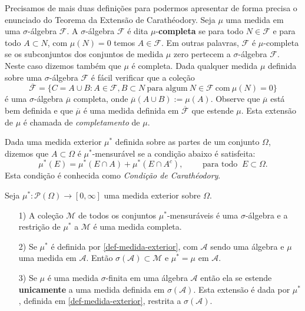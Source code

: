 Precisamos de mais duas definições para podermos 
apresentar de forma precisa o enunciado
do Teorema da Extensão de Carathéodory.
Seja $\mu$ uma medida em uma $\sigma$-álgebra $\mathcal{F}$.
A $\sigma$-álgebra $\mathcal{F}$ é dita $\mu$-{\bf completa} 
se para todo $N\in \mathcal{F}$ e para todo $A\subset N$, 
com $\mu(N)=0$ temos $A\in \mathcal{F}$.
Em outras palavras, $\mathcal{F}$ é $\mu$-completa 
se os subconjuntos dos conjuntos de medida $\mu$ zero
pertecem a $\sigma$-álgebra $\mathcal{F}$.
Neste caso dizemos também que $\mu$ é completa.
Dada qualquer medida $\mu$ definida sobre uma 
$\sigma$-álgebra $\mathcal{F}$ é fácil verificar que 
a coleção 
$$
\overline{\mathcal{F}}
=
\{ 	
	C=A\cup B: A\in\mathcal{F}, B\subset N\ \text{para algum}\ N\in\mathcal{F}\ \text{com}\ \mu(N)=0	
\}
$$
é uma $\sigma$-álgebra $\overline{\mu}$ completa, onde $\overline{\mu}(A\cup B):=\mu(A)$.
Observe que $\overline{\mu}$ está bem definida e 
que $\overline{\mu}$ é uma medida definida em $\overline{\mathcal{F}}$ que estende $\mu$.
Esta extensão de $\mu$ é chamada de  
{\it completamento}
de $\mu$.





\begin{definicao}
Dada uma medida exterior $\mu^{*}$ definida sobre as partes de um conjunto $\Omega$,
dizemos que $A\subset \Omega$ é $\mu^{*}$-mensurável se a condição abaixo é satisfeita:
\begin{equation}\label{cond-caratheodory}
\mu^{*}(E) = \mu^*(E\cap A) + \mu^*(E\cap A^c),
\qquad
\text{ para todo } \ E\subset\Omega.
\end{equation}
Esta condição é conhecida como {\it Condição de Carathéodory}.
\end{definicao}




\begin{teorema}
\label{teorema-caratheodory}
Seja $\mu^*:\mathcal{P}(\Omega)\to [0,\infty]$ uma medida exterior sobre $\Omega$.
\begin{itemize}
	\item[1)] A coleção $\mathcal{M}$ de todos os conjuntos $\mu^*$-mensuráveis
				é uma $\sigma$-álgebra e a restrição de $\mu^*$ a $\mathcal{M}$
				é uma medida completa.
	\item[2)] Se $\mu^*$ é definida por \eqref{def-medida-exterior}, com $\mathcal{A}$
				sendo uma álgebra e $\mu$ uma medida em $\mathcal{A}$. Então 
				$\sigma(\mathcal{A})\subset \mathcal{M}$ e $\mu^*=\mu$ em $\mathcal{A}$.
	\item[3)] Se $\mu$ é uma medida $\sigma$-finita em uma álgebra $\mathcal{A}$ 
				então ela se estende {\bf unicamente}
				 a uma medida definida em $\sigma(\mathcal{A})$. Esta extensão 
				 é dada por $\mu^*$, definida em \eqref{def-medida-exterior}, restrita
				 a $\sigma(\mathcal{A})$.
\end{itemize}
\end{teorema}


